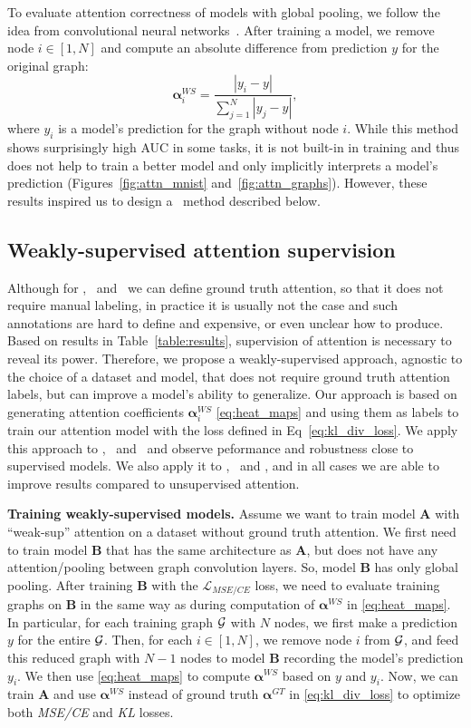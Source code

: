 To evaluate attention correctness of models with global pooling, we follow the idea from convolutional neural networks~\citep{zeiler2014visualizing}. After training a model, we remove node $i \in [1, N]$ and compute an absolute difference from prediction $y$ for the original graph:
%
\begin{equation}
\label{eq:heat_maps}
\mathbf{\alpha}_i^{WS} = \frac{|y_i - y|}{\sum_{j=1}^N |y_j - y|},
\end{equation}
%
where $y_i$ is a model's prediction for the graph without node $i$.
While this method shows surprisingly high AUC in some tasks, it is not built-in in training and thus does not help to train a better model and only implicitly interprets a model's prediction (Figures~\ref{fig:attn_mnist} and~\ref{fig:attn_graphs}). However, these results inspired us to design a \wsup~method described below.

\subsection{Weakly-supervised attention supervision}
\label{sec:wsup}
Although for , \tri~and \mnist~we can define ground truth attention, so that it does not require manual labeling, in practice it is usually not the case and such annotations are hard to define and expensive, or even unclear how to produce. Based on results in Table~\ref{table:results}, supervision of attention is necessary to reveal its power. Therefore, we propose a weakly-supervised approach, agnostic to the choice of a dataset and model, that does not require ground truth attention labels, but can improve a model's ability to generalize.
Our approach is based on generating attention coefficients $\mathbf{\alpha}_i^{WS}$ \eqref{eq:heat_maps} and using them as labels to train our attention model with the loss defined in Eq~\ref{eq:kl_div_loss}.
We apply this approach to , \tri~and \mnist~and observe peformance and robustness close to supervised models. We also apply it to \collab, \proteins~and \dd, and in all cases we are able to improve results compared to unsupervised attention.

\textbf{Training weakly-supervised models.}
Assume we want to train model \textbf{A} with ``weak-sup'' attention on a dataset without ground truth attention. We first need to train model \textbf{B} that has the same architecture as \textbf{A}, but does not have any attention/pooling between graph convolution layers. So, model \textbf{B} has only global pooling. After training \textbf{B} with the $\mathcal{L}_{MSE/CE}$ loss, we need to evaluate training graphs on \textbf{B} in the same way as during computation of $\mathbf{\alpha}^{WS}$ in \eqref{eq:heat_maps}. In particular, for each training graph $\cal G$ with $N$ nodes, we first make a prediction $y$ for the entire $\cal G$. Then, for each $i \in [1,N]$, we remove node $i$ from $\cal G$, and feed this reduced graph with $N-1$ nodes to model \textbf{B} recording the model's prediction $y_i$. We then use \eqref{eq:heat_maps} to compute $\mathbf{\alpha}^{WS}$ based on $y$ and $y_i$. Now, we can train \textbf{A} and use $\mathbf{\alpha}^{WS}$ instead of ground truth $\mathbf{\alpha}^{GT}$ in \eqref{eq:kl_div_loss} to optimize both \textit{MSE/CE} and \textit{KL} losses.


